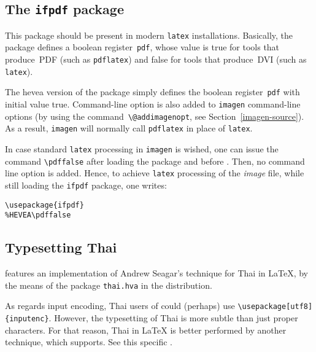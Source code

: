 \subsection{The \texttt{ifpdf} package}
This package should be present in modern \texttt{latex} installations.
Basically, the package defines a boolean register~\texttt{pdf}, whose
value is true for tools that produce~\textsc{PDF} (such as
\texttt{pdflatex}) and false for tools that produce~\textsc{DVI}
(such as \texttt{latex}).

The hevea version of the package simply defines the boolean
register~\texttt{pdf} with initial value true.  Command-line option
  is also added to \texttt{imagen} command-line
options (by using the command~\verb+\@addimagenopt+, see
Section~\ref{imagen-source}).  As a result, \texttt{imagen} will
normally call \texttt{pdflatex} in place of \texttt{latex}.

In case standard \texttt{latex} processing in \texttt{imagen} is
wished, one can issue the command \verb+\pdffalse+ after loading the
 package and before \verb++. Then, no
command line option is added.
Hence, to achieve \texttt{latex} processing of the \textit{image}
file, while still loading the \texttt{ifpdf} package, one writes:
\begin{verbatim}
\usepackage{ifpdf}
%HEVEA\pdffalse
\end{verbatim}

\subsection{Typesetting Thai}
%
\hevea{} features an implementation of Andrew Seagar's technique
for Thai in \LaTeX{},
by the means of the package \texttt{thai.hva} in the distribution.

As regards input encoding, Thai users of \hevea{} could (perhaps) use
\verb+\usepackage[utf8]{inputenc}+.
However, the typesetting of Thai is more subtle than just proper
characters.  For that reason, Thai in \LaTeX{} is better performed by
another technique, which \hevea{} supports.  See this specific
.

